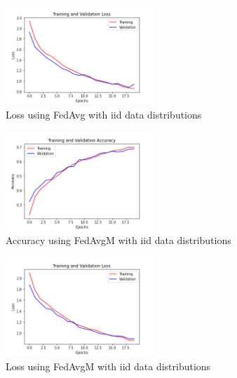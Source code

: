 \documentclass[twocolumn]{article}
\begin{document}
\begin{figure}
    \centering
    \includegraphics[width=0.5\textwidth,height=.3\textheight]{4_LossFedAvg_iid.png}
    \caption{Loss using FedAvg with iid data distributions}
     \label{LossFedAvgIid} 
\end{figure}

\begin{figure}
    \centering
    \includegraphics[width=0.5\textwidth,height=.3\textheight]{4_AccuracyFedAvgM_iid.png}
    \caption{Accuracy using FedAvgM with iid data distributions}
     \label{AccFedAvgMIid} 
\end{figure}

\begin{figure}
    \centering
    \includegraphics[width=0.5\textwidth,height=.3\textheight]{4_LossFedAvgM_iid.png}
    \caption{Loss using FedAvgM with iid data distributions}
     \label{LossFedAvgMIid} 
\end{figure}
\end{document}

